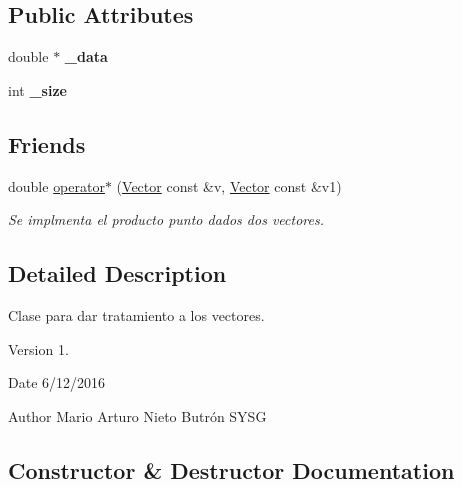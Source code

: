 \subsection*{Public Attributes}
\begin{DoxyCompactItemize}
\item 
\hypertarget{class_vector_a0ba0b12d5fe6ebde574a30241a52edde}{}\label{class_vector_a0ba0b12d5fe6ebde574a30241a52edde} 
double $\ast$ {\bfseries \+\_\+data}
\item 
\hypertarget{class_vector_ab3ce97d2c2c20389c4b415f7babe5ad0}{}\label{class_vector_ab3ce97d2c2c20389c4b415f7babe5ad0} 
int {\bfseries \+\_\+size}
\end{DoxyCompactItemize}
\subsection*{Friends}
\begin{DoxyCompactItemize}
\item 
\hypertarget{class_vector_ae3c6610ee1a4ebde040dbf3623b5a8af}{}\label{class_vector_ae3c6610ee1a4ebde040dbf3623b5a8af} 
double \hyperlink{class_vector_ae3c6610ee1a4ebde040dbf3623b5a8af}{operator$\ast$} (\hyperlink{class_vector}{Vector} const \&v, \hyperlink{class_vector}{Vector} const \&v1)
\begin{DoxyCompactList}\small\item\em Se implmenta el producto punto dados dos vectores. \end{DoxyCompactList}\end{DoxyCompactItemize}


\subsection{Detailed Description}
Clase para dar tratamiento a los vectores. 

\begin{DoxyVersion}{Version}
1. 
\end{DoxyVersion}
\begin{DoxyDate}{Date}
6/12/2016 
\end{DoxyDate}
\begin{DoxyAuthor}{Author}
Mario Arturo Nieto Butrón  S\+Y\+SG 
\end{DoxyAuthor}


\subsection{Constructor \& Destructor Documentation}
\hypertarget{class_vector_a96908fb25f0e8236d25650847ee504d5}{}\label{class_vector_a96908fb25f0e8236d25650847ee504d5} 
